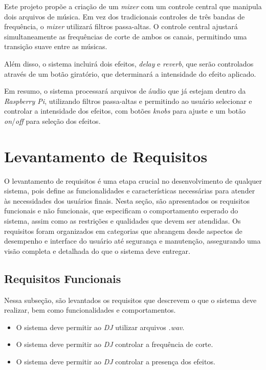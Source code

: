 Este projeto propõe a criação de um \textit{mixer} com um controle central que manipula dois arquivos de música. Em vez dos tradicionais controles de três bandas de frequência, o \textit{mixer} utilizará filtros passa-altas. O controle central ajustará simultaneamente as frequências de corte de ambos os canais, permitindo uma transição suave entre as músicas.

Além disso, o sistema incluirá dois efeitos, \textit{delay} e \textit{reverb}, que serão controlados através de um botão giratório, que determinará a intensidade do efeito aplicado.

Em resumo, o sistema processará arquivos de áudio que já estejam dentro da \textit{Raspberry Pi}, utilizando filtros passa-altas e permitindo ao usuário selecionar e controlar a intensidade dos efeitos, com botões \textit{knobs} para ajuste e um botão \textit{on}/\textit{off} para seleção dos efeitos.

\section{Levantamento de Requisitos}

O levantamento de requisitos é uma etapa crucial no desenvolvimento de qualquer sistema, pois define as funcionalidades e características necessárias para atender às necessidades dos usuários finais. Nesta seção, são apresentados os requisitos funcionais e não funcionais, que especificam o comportamento esperado do sistema, assim como as restrições e qualidades que devem ser atendidas. Os requisitos foram organizados em categorias que abrangem desde aspectos de desempenho e interface do usuário até segurança e manutenção, assegurando uma visão completa e detalhada do que o sistema deve entregar.

\subsection{Requisitos Funcionais}

Nessa subseção, são levantados os requisitos que descrevem o que o sistema deve realizar, bem como funcionalidades e comportamentos.
\begin{itemize}
    \item O sistema deve permitir ao \textit{DJ} utilizar arquivos \textit{.wav}.
    \item O sistema deve permitir ao \textit{DJ} controlar a frequência de corte.
    \item O sistema deve permitir ao \textit{DJ} controlar a presença dos efeitos.
\end{itemize}

